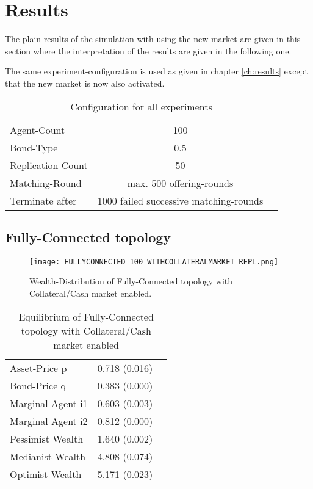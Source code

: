 \documentclass[Bachelorarbeit.tex]{subfiles}
\begin{document}
\section{Results}
The plain results of the simulation with using the new market are given in this section where the interpretation of the results are given in the following one.

\medskip

The same experiment-configuration is used as given in chapter \ref{ch:results} except that the new market is now also activated.

\begin{table}[H]
	\centering
	\caption{Configuration for all experiments}
	\begin{tabular} { l c r }
		\hline
		Agent-Count & 100 \\
		Bond-Type & 0.5 \\
		Replication-Count & 50 \\
		Matching-Round & max. 500 offering-rounds \\
		Terminate after & 1000 failed successive matching-rounds \\
		\hline
	\end{tabular}
\end{table}

\subsection{Fully-Connected topology}

\begin{figure}[H]
	\centering
  \texttt{[image: FULLYCONNECTED\_100\_WITHCOLLATERALMARKET\_REPL.png]}
	\caption{Wealth-Distribution of Fully-Connected topology with Collateral/Cash market enabled.}
	\label{fig:wealth_FULLYCONNECTED_100_WITHCOLLATERALMARKET_REPL}
\end{figure}

\begin{table}[H]
	\caption{Equilibrium of Fully-Connected topology with Collateral/Cash market enabled}
	\label{tab:equilibrium_FULLY_CONNECTED_WITH_COLLATERALCASH}
	\centering
	\begin{tabular} { l c r }
		\hline
		Asset-Price p & 0.718 (0.016) \\
		Bond-Price q & 0.383 (0.000) \\
		Marginal Agent i1 & 0.603 (0.003) \\
		Marginal Agent i2 & 0.812 (0.000) \\
		\hline
		Pessimist Wealth & 1.640 (0.002) \\
		Medianist Wealth & 4.808 (0.074) \\
		Optimist Wealth & 5.171 (0.023) \\
		\hline
	\end{tabular}
\end{table} 
\end{document}
